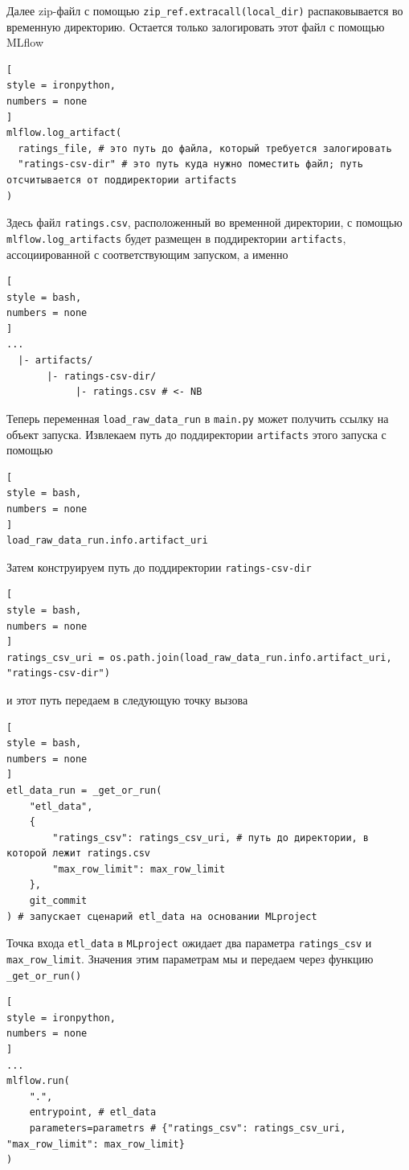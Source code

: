 \documentclass[%
	11pt,
	a4paper,
	utf8,
		]{article}
\begin{document}
Далее zip-файл с помощью \texttt{zip\_ref.extracall(local\_dir)} распаковывается во временную директорию. Остается только залогировать этот файл с помощью MLflow
\begin{lstlisting}[
style = ironpython,
numbers = none	
]
mlflow.log_artifact(
  ratings_file, # это путь до файла, который требуется залогировать
  "ratings-csv-dir" # это путь куда нужно поместить файл; путь отсчитывается от поддиректории artifacts
)
\end{lstlisting}

Здесь файл \texttt{ratings.csv}, расположенный во временной директории, с помощью \texttt{mlflow.log\_artifacts} будет размещен в поддиректории \texttt{artifacts}, ассоциированной с соответствующим запуском, а именно
\begin{lstlisting}[
style = bash,
numbers = none	
]
...
  |- artifacts/
       |- ratings-csv-dir/
            |- ratings.csv # <- NB
\end{lstlisting}

Теперь переменная \texttt{load\_raw\_data\_run} в \texttt{main.py} может получить ссылку на объект запуска. Извлекаем путь до поддиректории \texttt{artifacts} этого запуска с помощью
\begin{lstlisting}[
style = bash,
numbers = none	
]
load_raw_data_run.info.artifact_uri
\end{lstlisting}

Затем конструируем путь до поддиректории \texttt{ratings-csv-dir}
\begin{lstlisting}[
style = bash,
numbers = none	
]
ratings_csv_uri = os.path.join(load_raw_data_run.info.artifact_uri, "ratings-csv-dir")
\end{lstlisting}
и этот путь передаем в следующую точку вызова
\begin{lstlisting}[
style = bash,
numbers = none	
]
etl_data_run = _get_or_run(
    "etl_data",
    {
    	"ratings_csv": ratings_csv_uri, # путь до директории, в которой лежит ratings.csv
    	"max_row_limit": max_row_limit
    },
    git_commit
) # запускает сценарий etl_data на основании MLproject
\end{lstlisting}

Точка входа \texttt{etl\_data} в \texttt{MLproject} ожидает два параметра \texttt{ratings\_csv} и \verb|max_row_limit|. Значения этим параметрам мы и передаем через функцию \verb|_get_or_run()|
\begin{lstlisting}[
style = ironpython,
numbers = none	
]
...
mlflow.run(
    ".",
    entrypoint, # etl_data
    parameters=parametrs # {"ratings_csv": ratings_csv_uri, "max_row_limit": max_row_limit}
)
\end{lstlisting}
\end{document}

